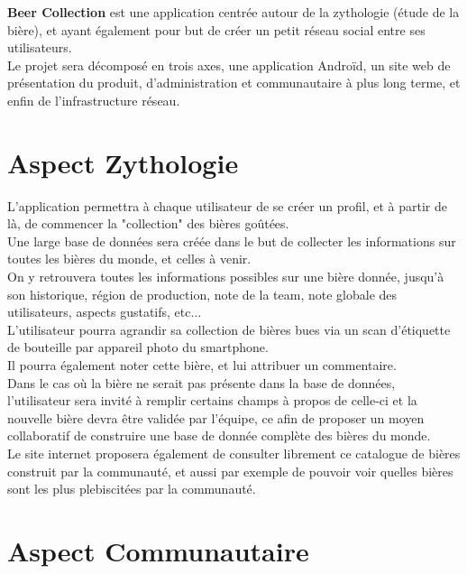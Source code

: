 \documentclass{report}
\begin{document}
	\textbf{Beer Collection} est une application centrée autour de la zythologie (étude de la bière), et ayant également pour but de créer un petit réseau social entre ses utilisateurs.\\

	Le projet sera décomposé en trois axes, une application Androïd, un site web de présentation du produit, d'administration et communautaire à plus long terme, et enfin de l'infrastructure réseau.\\

	\section{Aspect Zythologie}

		L'application permettra à chaque utilisateur de se créer un profil, et à partir de là, de commencer la "collection" des bières goûtées.\\

		Une large base de données sera créée dans le but de collecter les informations sur toutes les bières du monde, et celles à venir.\\
		On y retrouvera toutes les informations possibles sur une bière donnée, jusqu'à son historique, région de production, note de la team, note globale des utilisateurs, aspects gustatifs, etc...\\

		L'utilisateur pourra agrandir sa collection de bières bues via un scan d'étiquette de bouteille par appareil photo du smartphone.\\
		Il pourra également noter cette bière, et lui attribuer un commentaire.\\

		Dans le cas où la bière ne serait pas présente dans la base de données, l'utilisateur sera invité à remplir certains champs à propos de celle-ci et la nouvelle bière devra être validée par l'équipe, ce afin de proposer un moyen collaboratif de construire une base de donnée complète des bières du monde.\\

		Le site internet proposera également de consulter librement ce catalogue de bières construit par la communauté, et aussi par exemple de pouvoir voir quelles bières sont les plus plebiscitées par la communauté.\\

	\section{Aspect Communautaire}
\end{document}
